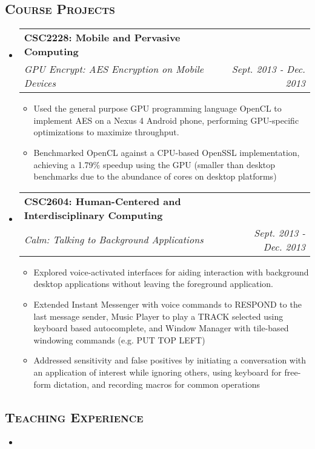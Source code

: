 \documentclass[letterpaper,11pt]{article}
\makeatletter
\newcommand{\BulletZeroLeftMargin}{1.5em}
\newcommand{\company}[1]{%
    \textbf{#1}
}
\newcommand{\heading}[1]{%
    \textsc{\textbf{#1}}
}
\newcommand*\resheading[1]{\subsection*{\heading{#1}}\vspace{0.3em}\nopagebreak[4]}
\newcommand{\resitem}[1]{\item #1 \vspace{-2pt}}
\newcommand{\ressubheading}[4]{
\begin{tabular*}{6.5in}{l@{\extracolsep{\fill}}r}
    
		\company{#1} & #2 \\
		\textit{#3} & \textit{#4} \\
\end{tabular*}\vspace{-6pt}}
\makeatother
\begin{document}
\begin{minipage}{\textwidth}

\resheading{Course Projects}
\begin{itemize}[leftmargin=\BulletZeroLeftMargin]

\item

	\ressubheading{CSC2228: Mobile and Pervasive Computing}{}{GPU Encrypt: AES Encryption on Mobile Devices}{Sept. 2013 - Dec. 2013}
    \begin{itemize}[leftmargin=\BulletZeroLeftMargin]
		\resitem{
            Used the general purpose GPU programming language OpenCL to implement AES on a 
            Nexus 4 Android phone, performing GPU-specific optimizations to maximize 
            throughput.
        }
		\resitem{
            Benchmarked OpenCL against a CPU-based OpenSSL implementation, achieving a 
            1.79\% speedup using the GPU (smaller than desktop benchmarks due to the 
            abundance of cores on desktop platforms)
        }
	\end{itemize}

\item
	\ressubheading{CSC2604: Human-Centered and Interdisciplinary Computing}{}{Calm: Talking to Background Applications}{Sept. 2013 - Dec. 2013}
    \begin{itemize}[leftmargin=\BulletZeroLeftMargin]
		\resitem{
            Explored voice-activated interfaces for aiding interaction with background 
            desktop applications without leaving the foreground application.
        }
		\resitem{
            Extended Instant Messenger with voice commands to RESPOND to the last message 
            sender, Music Player to play a TRACK selected using keyboard based 
            autocomplete, and Window Manager with tile-based windowing commands (e.g. PUT 
            TOP LEFT)
        }
		\resitem{
            Addressed sensitivity and false positives by initiating a conversation with an
            application of interest while ignoring others, using keyboard for free-form 
            dictation, and recording macros for common operations
        }
	\end{itemize}

\end{itemize}

\resheading{Teaching Experience}
\begin{itemize}[leftmargin=\BulletZeroLeftMargin]
\item


\end{itemize}
\end{minipage}
\end{document}
